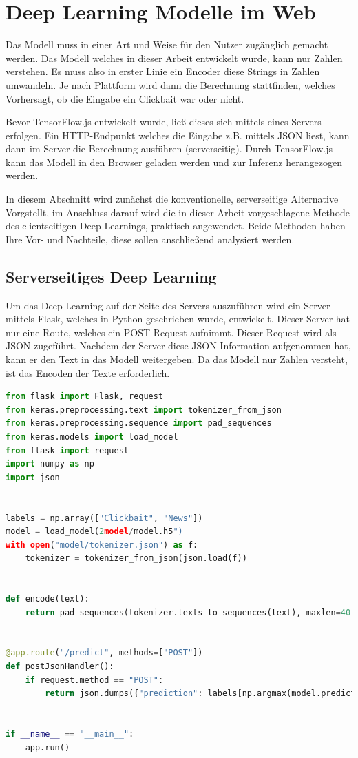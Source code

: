 \chapter{Deep Learning Modelle im Web}
Das Modell muss in einer Art und Weise für den Nutzer zugänglich gemacht werden. Das Modell welches in dieser Arbeit entwickelt wurde, kann nur Zahlen verstehen. Es muss also in erster Linie ein Encoder diese Strings in Zahlen umwandeln. Je nach Plattform wird dann die Berechnung stattfinden, welches Vorhersagt, ob die Eingabe ein Clickbait war oder nicht. 

Bevor TensorFlow.js entwickelt wurde, ließ dieses sich mittels eines Servers erfolgen. Ein HTTP-Endpunkt welches die Eingabe z.B. mittels JSON liest, kann dann im Server die Berechnung ausführen (serverseitig). Durch TensorFlow.js kann das Modell in den Browser geladen werden und zur Inferenz herangezogen werden.

In diesem Abschnitt wird zunächst die konventionelle, serverseitige Alternative Vorgstellt, im Anschluss darauf wird die in dieser Arbeit vorgeschlagene Methode des clientseitigen Deep Learnings, praktisch angewendet. Beide Methoden haben Ihre Vor- und Nachteile, diese sollen anschließend analysiert werden.

\section{Serverseitiges Deep Learning}
Um das Deep Learning auf der Seite des Servers auszuführen wird ein Server mittels Flask, welches in Python geschrieben wurde, entwickelt. Dieser Server hat nur eine Route, welches ein POST-Request aufnimmt. Dieser Request wird als JSON zugeführt. Nachdem der Server diese JSON-Information aufgenommen hat, kann er den Text in das Modell weitergeben. Da das Modell nur Zahlen versteht, ist das Encoden der Texte erforderlich. 

\begin{lstlisting}[language=Python,caption=Beispiel eines Servers für die Vorhersage von Clickbaits, label={Server}]
from flask import Flask, request
from keras.preprocessing.text import tokenizer_from_json
from keras.preprocessing.sequence import pad_sequences
from keras.models import load_model
from flask import request
import numpy as np
import json


labels = np.array(["Clickbait", "News"])
model = load_model(2model/model.h5")
with open("model/tokenizer.json") as f:
    tokenizer = tokenizer_from_json(json.load(f))


def encode(text):
    return pad_sequences(tokenizer.texts_to_sequences(text), maxlen=40)


@app.route("/predict", methods=["POST"])
def postJsonHandler():
    if request.method == "POST":
        return json.dumps({"prediction": labels[np.argmax(model.predict(encode([request.get_json()["text"]])))]})

        
if __name__ == "__main__":
    app.run()
\end{lstlisting}

